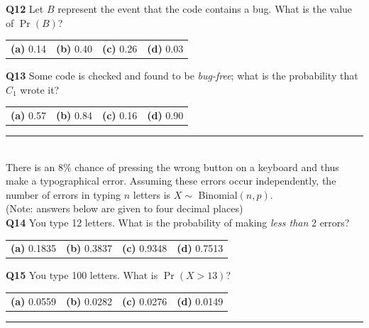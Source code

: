 \documentclass[12pt]{article}
\begin{document}
{\bf Q12} Let $B$ represent the event that the code contains a bug. What is the value of $\Pr(B)$?\\[0.2cm]
\begin{tabular}{cccc}
{\bf(a)} 0.14 & {\bf(b)} 0.40 & {\bf(c)} 0.26  & {\bf(d)} 0.03 \\[0.6cm]
\end{tabular}

{\bf Q13}  Some code is checked and found to be \emph{bug-free}; what is the probability that $C_1$ wrote it?\\[0.2cm]
\begin{tabular}{cccc}
{\bf(a)} 0.57 & {\bf(b)} 0.84  & {\bf(c)} 0.16 & {\bf(d)} 0.90 \\[0.6cm]
\end{tabular}


\rule{\linewidth}{1pt}
\quad\\
There is an 8\% chance of pressing the wrong button on a keyboard and thus make a typographical error. Assuming these errors occur independently, the number of errors in typing $n$ letters is $X \sim$ Binomial$(n,p)$.\\{\footnotesize(Note: answers below are given to four decimal places)}\\[0.3cm]

{\bf Q14} You type 12 letters. What is the probability of making \emph{less than} 2 errors?\\[0.2cm]
\begin{tabular}{cccc}
{\bf(a)} 0.1835 & {\bf(b)} 0.3837 & {\bf(c)} 0.9348 & {\bf(d)} 0.7513 \\[0.6cm]
\end{tabular}

{\bf Q15} You type 100 letters. What is $\Pr(X > 13)$? \\[0.2cm]
\begin{tabular}{cccc}
{\bf(a)} 0.0559 & {\bf(b)} 0.0282   & {\bf(c)} 0.0276 & {\bf(d)} 0.0149 \\[0.6cm]
\end{tabular}

\rule{\linewidth}{1pt}
\end{document}

